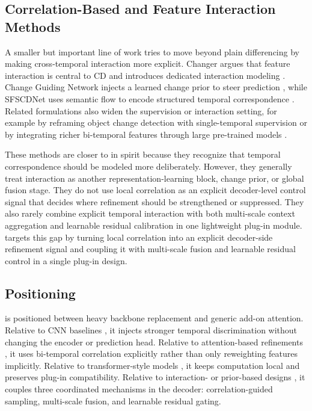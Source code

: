 \subsection{Correlation-Based and Feature Interaction Methods}
A smaller but important line of work tries to move beyond plain differencing by making cross-temporal interaction more explicit. Changer argues that feature interaction is central to CD and introduces dedicated interaction modeling \cite{fang2022changer}. Change Guiding Network injects a learned change prior to steer prediction \cite{10234560}, while SFSCDNet uses semantic flow to encode structured temporal correspondence \cite{k2024}. Related formulations also widen the supervision or interaction setting, for example by reframing object change detection with single-temporal supervision \cite{zheng2021change} or by integrating richer bi-temporal features through large pre-trained models \cite{chen2023time}.

These methods are closer to \cosa{} in spirit because they recognize that temporal correspondence should be modeled more deliberately. However, they generally treat interaction as another representation-learning block, change prior, or global fusion stage. They do not use local correlation as an explicit decoder-level control signal that decides where refinement should be strengthened or suppressed. They also rarely combine explicit temporal interaction with both multi-scale context aggregation and learnable residual calibration in one lightweight plug-in module. \cosa{} targets this gap by turning local correlation into an explicit decoder-side refinement signal and coupling it with multi-scale fusion and learnable residual control in a single plug-in design.

\subsection{Positioning \cosa{}}
\cosa{} is positioned between heavy backbone replacement and generic add-on attention. Relative to CNN baselines \cite{daudt2018fully,hongruixuan2019}, it injects stronger temporal discrimination without changing the encoder or prediction head. Relative to attention-based refinements \cite{chen2020stanet,10093022,yan2024}, it uses bi-temporal correlation explicitly rather than only reweighting features implicitly. Relative to transformer-style models \cite{chen2022bit,bandara2022changeformer,wei2024}, it keeps computation local and preserves plug-in compatibility. Relative to interaction- or prior-based designs \cite{fang2022changer,10234560,k2024}, it couples three coordinated mechanisms in the decoder: correlation-guided sampling, multi-scale fusion, and learnable residual gating.

